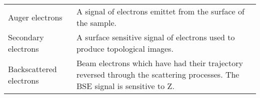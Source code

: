 \begin{table}[phb]
\begin{center}
\begin{tabular}{p{4cm}p{10.6cm}}
            Auger electrons         & A signal of electrons emittet from the surface of the sample.                                                                                                                                              \\
            Secondary electrons     & A surface sensitive signal of electrons used to produce topological images.                                                                                                                                \\
            Backscattered electrons & Beam electrons which have had their trajectory reversed through the scattering processes. The BSE signal is sensitive to Z.                                                                                \\
            \hline
        \end{tabular}
    \end{center}
\end{table}